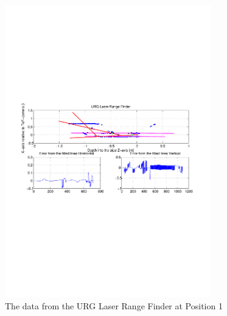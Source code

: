 \begin{figure}[htbp]
    \centering
    \includegraphics[width=0.8\textwidth]{pics/pos1-regular-urg-2d}
    \caption{The data from the URG Laser Range Finder at Position 1}
    \label{chap7:fig-pos1-regular-urg-2d}
\end{figure}

